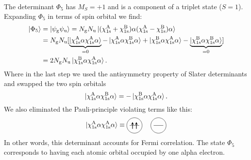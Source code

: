 \documentclass[../Main/chem532-notes.tex]{subfiles}
\begin{document}
The determinant $\Phi_5$ has $M_S = +1$ and is a component of a triplet state ($S = 1$).
Expanding $\Phi_5$ in terms of spin orbital we find:
\begin{equation}
\begin{split}
\ket{\Phi_5} &= \ket{\psi_{\mathrm{g}} \psi_{\mathrm{u}}} = N_{\mathrm{g}} N_{\mathrm{u}} \ket{ (\chi_{1\rm s}^{\rm A} + \chi_{1\rm s}^{\rm B}) \alpha  (\chi_{1\rm s}^{\rm A} - \chi_{1\rm s}^{\rm B}) \alpha} \\
&= N_{\mathrm{g}} N_{\mathrm{u}}  [
\underbrace{\ket{\chi_{1\rm s}^{\rm A}\alpha \chi_{1\rm s}^{\rm A}\alpha}}_{= 0}
- \ket{\chi_{1\rm s}^{\rm A}\alpha \chi_{1\rm s}^{\rm B}\alpha}
+ \ket{\chi_{1\rm s}^{\rm B}\alpha \chi_{1\rm s}^{\rm A}\alpha} 
- \underbrace{\ket{\chi_{1\rm s}^{\rm B}\alpha \chi_{1\rm s}^{\rm B}\alpha}}_{= 0}] \\
&= 2 N_{\mathrm{g}} N_{\mathrm{u}}  \ket{\chi_{1\rm s}^{\rm B}\alpha \chi_{1\rm s}^{\rm A}\alpha} .
\end{split}
\end{equation}
Where in the last step we used the antisymmetry property of Slater determinants and swapped the two spin orbitals
\begin{equation}
\ket{\chi_{1\rm s}^{\rm A}\alpha \chi_{1\rm s}^{\rm B}\alpha} = -\ket{\chi_{1\rm s}^{\rm B}\alpha \chi_{1\rm s}^{\rm A}\alpha}.
\end{equation}
We also eliminated the Pauli-principle violating terms like this:
\begin{equation}
 \ket{\chi_{1\rm s}^{\rm A}\alpha \chi_{1\rm s}^{\rm A}\alpha} \equiv 
 \begin{tikzpicture}[baseline={([yshift=-.5ex]current bounding box.center)},vertex/.style={anchor=base, minimum size=18pt, inner sep=2pt}]
    \draw (0.25,0.5) circle (0.4);
    \draw (0,0.5) -- (0.5,0.5);
    \draw[thick,->,>=stealth] (0.15,0.325) -- (0.15,0.675);
    \draw[thick,->,>=stealth] (0.35,0.325) -- (0.35,0.675);    
    \draw (1.5,0.5) circle (0.4);
    \draw (1.25,0.5) -- (1.75,0.5);
  \end{tikzpicture}
\end{equation}
In other words, this determinant accounts for Fermi correlation.
The state $\Phi_5$ corresponds to having each atomic orbital occupied by one alpha electron.
\end{document}
